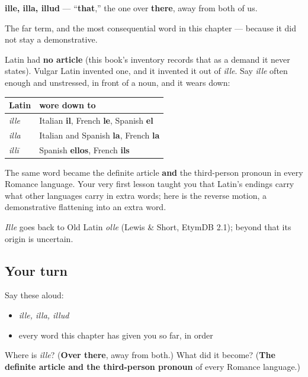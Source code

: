 \begin{cousinweb}
\textbf{ille, illa, illud} — \textquotedblleft{}\textbf{that},\textquotedblright{} the one over \textbf{there}, away from both of us.

The far term, and the most consequential word in this chapter — because it did not stay a demonstrative.

Latin had \textbf{no article} (this book's inventory records that as a demand it never states). Vulgar Latin invented one, and it invented it out of \emph{ille}. Say \emph{ille} often enough and unstressed, in front of a noun, and it wears down:

\noindent
\begin{tabularx}{\linewidth}{@{}>{\raggedright\arraybackslash}X>{\raggedright\arraybackslash}X@{}}
\toprule
\textbf{Latin} & \textbf{wore down to} \\
\midrule
\emph{ille} & Italian \textbf{il}, French \textbf{le}, Spanish \textbf{el} \\
\emph{illa} & Italian and Spanish \textbf{la}, French \textbf{la} \\
\emph{illī} & Spanish \textbf{ellos}, French \textbf{ils} \\
\bottomrule
\end{tabularx}

The same word became the definite article \textbf{and} the third-person pronoun in every Romance language. Your very first lesson taught you that Latin's endings carry what other languages carry in extra words; here is the reverse motion, a demonstrative flattening into an extra word.

\emph{Ille} goes back to Old Latin \emph{olle} (Lewis \& Short, EtymDB 2.1); beyond that its origin is uncertain.
\end{cousinweb}

\subsection*{Your turn}
Say these aloud:

\begin{itemize}
\raggedright
  \item \emph{ille, illa, illud}
  \item every word this chapter has given you so far, in order
\end{itemize}

\begin{tcolorbox}[breakable,colback=teal!4,colframe=teal!35!black,title={Before you move on}]
Where is \emph{ille}? (\textbf{Over there}, away from both.) What did it become? (\textbf{The definite article and the third-person pronoun} of every Romance language.)
\end{tcolorbox}
